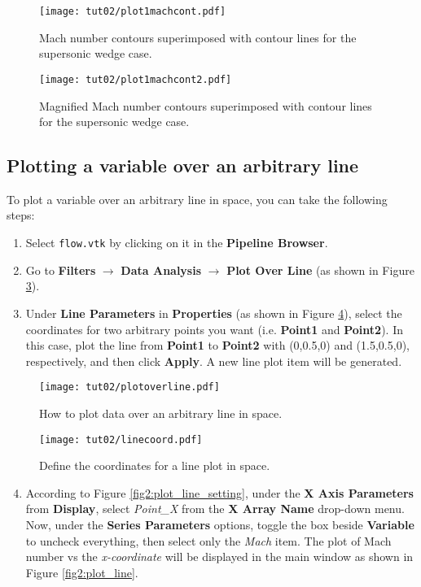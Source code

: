 \begin{figure}[ht]
    \centering
    \texttt{[image: tut02/plot1machcont.pdf]}
    \caption{Mach number contours superimposed with contour lines for the supersonic wedge case.}
    \label{fig2:mach_contour}
\end{figure}
\begin{figure}[ht]
    \centering
    \texttt{[image: tut02/plot1machcont2.pdf]}
    \caption{Magnified Mach number contours superimposed with contour lines for the supersonic wedge case.}
    \label{fig2:mach_contour_zoom}
\end{figure}
\subsection{Plotting a variable over an arbitrary line}
To plot a variable over an arbitrary line in space, you can take the following steps:
\begin{enumerate}[label=\arabic*)]
	\setcounter{enumi}{0}
	\item Select \texttt{flow.vtk} by clicking on it in the \textbf{Pipeline Browser}.
	\item Go to \textbf{Filters} $\rightarrow$  \textbf{Data Analysis} $\rightarrow$  \textbf{Plot Over Line} (as shown in Figure \ref{fig2:plot_over_line}).
	\item Under \textbf{Line Parameters} in \textbf{Properties} (as shown in Figure \ref{fig2:line_coordinate}), select the coordinates for two arbitrary points you want (i.e. \textbf{Point1} and \textbf{Point2}). In this case, plot the line from \textbf{Point1} to \textbf{Point2} with (0,0.5,0) and (1.5,0.5,0), respectively, and then click \textbf{Apply}. A new line plot item will be generated.
\end{enumerate}
\begin{figure}[H]
	\centering
	\texttt{[image: tut02/plotoverline.pdf]}
	\caption{How to plot data over an arbitrary line in space.}
	\label{fig2:plot_over_line}
\end{figure}
\begin{figure}[ht]
	\centering
	\texttt{[image: tut02/linecoord.pdf]}
	\caption{Define the coordinates for a line plot in space.}
	\label{fig2:line_coordinate}
\end{figure}
\begin{enumerate}[label=\arabic*)]
	\setcounter{enumi}{3}
	\item  According to Figure \ref{fig2:plot_line_setting}, under the \textbf{X Axis Parameters} from \textbf{Display}, select \textit{Point\_X} from the \textbf{X Array Name} drop-down menu. Now, under the \textbf{Series Parameters} options, toggle the box beside \textbf{Variable} to uncheck everything, then select only the \textit{Mach} item. The plot of Mach number vs the \textit{x-coordinate} will be displayed in the main window as shown in Figure \ref{fig2:plot_line}.
\end{enumerate}
